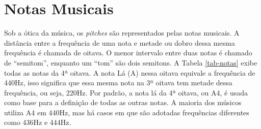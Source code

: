 \section{Notas Musicais}

Sob a ótica da música, os \textit{pitches} são representados pelas notas musicais. A distância entre a frequência de uma nota e metade ou dobro dessa mesma frequência é chamada de oitava. O menor intervalo entre duas notas é chamado de ``semitom'', enquanto um ``tom'' são dois semitons. A Tabela \ref{tab-notas} exibe todas as notas da 4ª oitava. A nota Lá (A) nessa oitava equivale a frequência de 440Hz, isso significa que essa mesma nota na 3ª oitava tem metade dessa frequência, ou seja, 220Hz. Por padrão, a nota lá da 4ª oitava, ou A4, é usada como base para a definição de todas as outras notas. A maioria dos músicos utiliza A4 em 440Hz, mas há casos em que são adotadas frequências diferentes como 436Hz e 444Hz.

